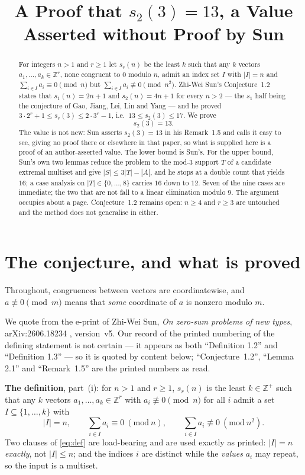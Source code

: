 \documentclass[11pt]{amsart}
\title[A proof that $s_2(3)=13$]
{A Proof that $s_2(3)=13$, a Value Asserted without Proof by Sun}
\date{}
\newcommand{\ZZ}{\mathbb Z}
\begin{document}
\begin{abstract}
For integers $n>1$ and $r\ge1$ let $s_r(n)$ be the least $k$ such that any $k$
vectors $a_1,\dots,a_k\in\ZZ^r$, none congruent to $0$ modulo $n$, admit an index
set $I$ with $|I|=n$ and $\sum_{i\in I}a_i\equiv0\pmod n$ but
$\sum_{i\in I}a_i\not\equiv0\pmod{n^2}$. Zhi-Wei Sun's Conjecture~1.2 states
that $s_1(n)=2n+1$ and $s_2(n)=4n+1$ for every $n>2$ --- the $s_1$ half being
the conjecture of Gao, Jiang, Lei, Lin and Yang --- and he proved
$3\cdot2^r+1\le s_r(3)\le2\cdot3^r-1$, i.e.\ $13\le s_2(3)\le17$. We prove
\[
  s_2(3)=13.
\]
The value is not new: Sun asserts $s_2(3)=13$ in his Remark~1.5 and calls it
easy to see, giving no proof there or elsewhere in that paper, so what is
supplied here is a proof of an author-asserted value. The lower bound is Sun's.
For the upper bound, Sun's own two lemmas reduce the problem to the mod-$3$
support $T$ of a candidate extremal multiset and give $|S|\le3|T|-|A|$, and he
stops at a double count that yields $16$; a case analysis on
$|T|\in\{0,\dots,8\}$ carries $16$ down to $12$. Seven of the nine cases are
immediate; the two that are not fall to a linear elimination modulo $9$. The
argument occupies about a page. Conjecture~1.2 remains open: $n\ge4$ and $r\ge3$
are untouched and the method does not generalise in either.
\end{abstract}

\maketitle

\section{The conjecture, and what is proved}

Throughout, congruences between vectors are coordinatewise, and
$a\not\equiv0\pmod m$ means that \emph{some} coordinate of $a$ is nonzero
modulo $m$.

We quote from the e-print of Zhi-Wei Sun, \emph{On zero-sum problems of new
types}, arXiv:2606.18234 \cite{Sun}, version~v5. Our record of the printed
numbering of the defining statement is not certain --- it appears as both
``Definition 1.2'' and ``Definition 1.3'' --- so it is quoted by content below;
``Conjecture~1.2'', ``Lemma 2.1'' and ``Remark~1.5'' are the printed numbers as
read.

\smallskip
\noindent\textbf{The definition}, part~(i): for $n>1$ and $r\ge1$,
$s_r(n)$ is the least $k\in\ZZ^{+}$ such that any $k$ vectors
$a_1,\dots,a_k\in\ZZ^r$ with $a_i\not\equiv0\pmod n$ for all $i$ admit a set
$I\subseteq\{1,\dots,k\}$ with
\begin{equation}\label{eq:def}
  |I|=n,\qquad
  \sum_{i\in I}a_i\equiv0\ (\mathrm{mod}\ n),\qquad
  \sum_{i\in I}a_i\not\equiv0\ (\mathrm{mod}\ n^2).
\end{equation}
Two clauses of \eqref{eq:def} are load-bearing and are used exactly as printed:
$|I|=n$ \emph{exactly}, not $|I|\le n$; and the indices $i$ are distinct while
the \emph{values} $a_i$ may repeat, so the input is a multiset.
\end{document}
